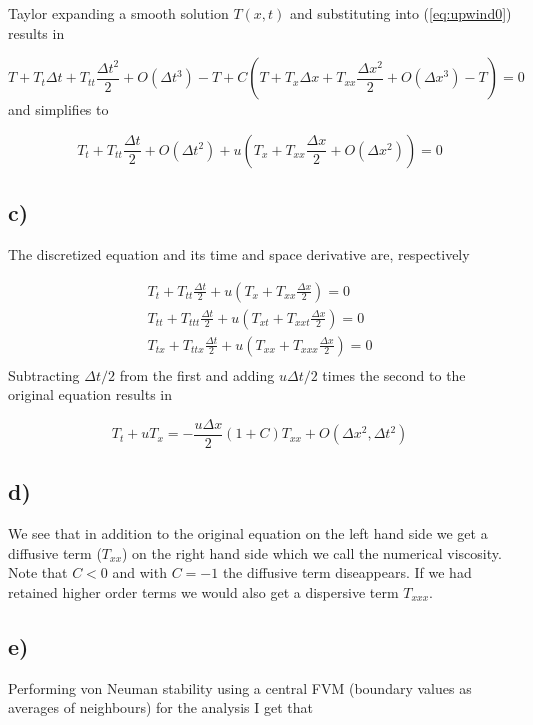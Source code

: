 \documentclass{article}
\begin{document}
Taylor expanding a smooth solution $T(x,t)$ and substituting into (\ref{eq:upwind0}) results in

\begin{equation}
 	T + T_t \Delta t + T_{tt}\frac{\Delta t^2}{2} +O(\Delta t^3) - T +	C(T + T_x \Delta x + T_{xx}  \frac{\Delta x^2}{2} + O(\Delta x^3)- T) = 0
\end{equation}
and simplifies to

\begin{equation}
 	T_t  + T_{tt}\frac{\Delta t}{2}  + O(\Delta t^2) +	u( T_x  + T_{xx}  \frac{\Delta x}{2} + O(\Delta x^2) ) =0
\end{equation}

\subsection{c)}

The discretized equation and its time and space derivative are, respectively

\begin{align}
	T_t  + T_{tt}\frac{\Delta t}{2} + 	u( T_x  + T_{xx}  \frac{\Delta x}{2} ) =0 \\
	T_{tt}  + T_{ttt}\frac{\Delta t}{2} +	u( T_{xt}  + T_{xxt}  \frac{\Delta x}{2} ) =0 \\
	T_{tx}  + T_{ttx}\frac{\Delta t}{2} +	u( T_{xx}  + T_{xxx}  \frac{\Delta x}{2} ) =0 \\
\end{align}
Subtracting $\Delta t/2$ from the first and adding $u\Delta t/2$ times the second to the original equation results in

\begin{equation}
T_t  + uT_{x} = -\frac{u\Delta x}{2} (1+ C)T_{xx} + O(\Delta x^2, \Delta t^2)
\end{equation}

\subsection{d)}

We see that in addition to the original equation on the left hand side we get a diffusive term ($T_{xx}$) on the right hand side which we call the numerical viscosity. Note that $C<0$ and with $C=-1$ the diffusive term diseappears. If we had retained higher order terms we would also get a dispersive term $T_{xxx}$.

\subsection{e)}
Performing von Neuman stability using a central FVM (boundary values as averages of neighbours) for the analysis I get that
\end{document}
